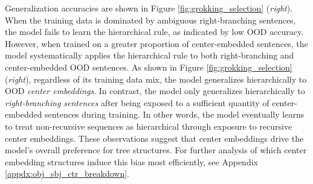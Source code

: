 Generalization accuracies are shown in Figure \ref{fig:grokking_selection} (\textit{right}). When the training data is dominated by ambiguous right-branching sentences, the model fails to learn the hierarchical rule, as indicated by low OOD accuracy. However, when trained on a greater proportion of center-embedded sentences, the model systematically applies the hierarchical rule to both right-branching and center-embedded OOD sentences. As shown in Figure \ref{fig:grokking_selection} (\textit{right}), regardless of its training data mix, the model  generalizes hierarchically to OOD \textit{center embeddings}. In contrast, the model only generalizes hierarchically to \textit{right-branching sentences} after being exposed to a sufficient quantity of center-embedded sentences during training. In other words, the model eventually learns to treat non-recursive sequences as hierarchical through exposure to recursive center embeddings. These observations suggest that center embeddings drive the model's overall preference for tree structures. For further analysis of which center embedding structures induce this bias most efficiently, see Appendix \ref{appdx:obj_sbj_ctr_breakdown}.




